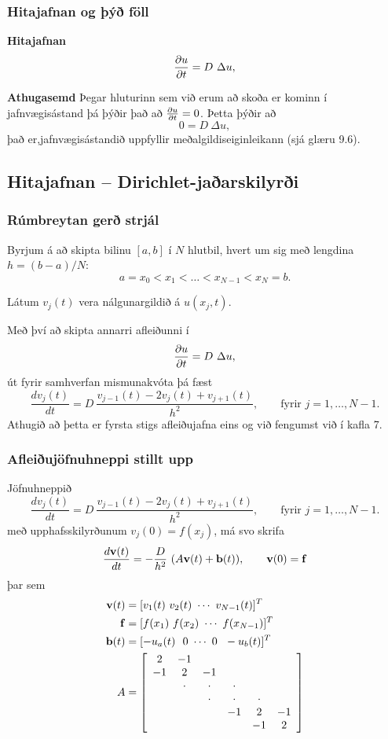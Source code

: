 \documentclass[icelandic,a4paper,12pt]{article}
\begin{document}
\subsubsection{Hitajafnan og þýð föll}
\textbf{Hitajafnan}
  $$
  \frac{{\partial} u}{{\partial} t} = D\  \Delta u,
 $$
 
 
 \textbf{Athugasemd}
  Þegar hluturinn sem við erum að skoða er kominn í jafnvægisástand þá
  þýðir það að $\frac{{\partial} u}{{\partial} t} = 0$. \pause Þetta þýðir að 
  $$
     0 =  D\ \Delta u,
  $$
  það er,jafnvægisástandið uppfyllir meðalgildiseiginleikann (sjá glæru 9.6).
 
 


\subsection{Hitajafnan --  Dirichlet-jaðarskilyrði }

\subsubsection{Rúmbreytan gerð strjál }
Byrjum á að skipta bilinu $[a,b]$ í $N$ hlutbil, hvert um sig með lengdina
 $h=(b-a)/N$:
 $$
    a = x_0 < x_1 < \ldots < x_{N-1} < x_N = b.
 $$ \pause
 
Látum $v_j(t)$ vera nálgunargildið á $u(x_j,t)$.
 
Með því að skipta annarri afleiðunni í 
 $$
 \frac{{\partial} u}{{\partial} t} =  D\ \Delta u,
 $$
út fyrir samhverfan mismunakvóta þá fæst
 $$ 
 \frac{d v_j(t)}{d t} =  D\  \frac{v_{j-1}(t) -2 v_j(t) + v_{j+1}(t)}{h^2}, \qquad
 \text{fyrir } j=1,\ldots,N-1.
 $$
Athugið að þetta er fyrsta stigs afleiðujafna eins og við fengumst við í kafla 7.


\subsubsection{Afleiðujöfnuhneppi stillt upp}
Jöfnuhneppið 
 $$ 
 \frac{d v_j(t)}{d t} =  D\  \frac{v_{j-1}(t) -2 v_j(t) + v_{j+1}(t)}{h^2}, \qquad
 \text{fyrir } j=1,\ldots,N-1.
 $$ \pause
með upphafsskilyrðunum $v_j(0) = f(x_j)$, \pause
má svo skrifa
 $$ 
 \frac{d \mbox{${\bf v}$}(t)}{d t} =  -\frac{D}{h^2}\  (A\mbox{${\bf v}$}(t) + \mbox{${\bf b}$}(t)), \qquad \mbox{${\bf v}$}(0)=\mbox{${\bf f}$}
 $$
þar sem 
 \begin{align*}
  \mbox{${\bf v}$}(t) &= [v_1(t) \ v_2(t) \ \cdots \ v_{N-1}(t) ]^T\\
  \mbox{${\bf f}$} &= [ f(x_1) \ f(x_2) \ \cdots \ f(x_{N-1}) ]^T\\
  \mbox{${\bf b}$}(t) &= [ -u_a(t) \ \ 0 \ \cdots \ 0 \ \ -u_b(t) ]^T \\
  A &=  \left[\begin{array}{cccccc}
2 & -1 &   &   &   &  \\
-1 & 2 & -1 &   &   &  \\
  & \cdot & \cdot & \cdot &   &  \\
  &   & \cdot & \cdot & \cdot &  \\
  &   &  & -1 & 2 & -1\\
  &   &   &   & -1 & 2
      \end{array}\right]
 \end{align*}
\end{document}
